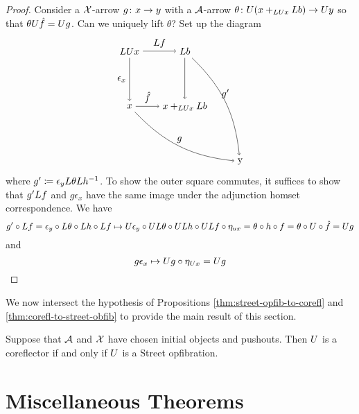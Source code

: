 \documentclass{amsart}
\begin{document}
\begin{proof}
  Consider a $ \mathcal{X} $-arrow $ g \colon x \to y $
  with a $ \mathcal{A} $-arrow
  $ \theta \colon U( x +_{LU x} L b ) \to U y $ so
  that $ \theta U \hat{f} = U g $.  Can we
  uniquely lift $ \theta $? Set up the diagram
  \[
    \begin{tikzpicture}
      \node (ul) at (0,2) {$ \L\U x $};
      \node (ll) at (0,0) {$ x $};
      \node (ur) at (2,2) {$ \L b $};
      \node (lr) at (2,0) {$ x +_{\L\U x} \L b$};
      \node (comp) at (4,-2) {y};
      \draw [->] (ul) to node [left] {$ \epsilon_x $} (ll);
      \draw [->] (ul) to node [above] {$ \L f $} (ur);
      \draw [->] (ll) to node [above] {$ \hat{f} $} (lr);
      \draw [->] (ur) to (lr);
      \draw [->] (ll) to [bend right=20] node [above] {$ g $} (comp);
      \draw [->] (ur) to [bend left=20] node [above] {$ g' $} (comp);
    \end{tikzpicture}
  \] 
  where $ g' \coloneqq \epsilon_y L\theta L h^{-1} $.
  To show the outer square commutes, it suffices
  to show that $ g' L f $ and $ g \epsilon_x $
  have the same image under the adjunction homset
  correspondence.  We have
  \[
    g' \circ L f =
    \epsilon_y \circ L\theta \circ L h \circ L f
    \mapsto
    U\epsilon_y \circ UL\theta \circ UL h
      \circ UL f \circ\eta_{ux}
    = \theta \circ h \circ f   
    = \theta \circ U \circ \hat{f} 
    = U g
  \]
  and 
  \[
    g \epsilon_x
    \mapsto
    U g \circ \eta_{U x}
    = U g
  \]
\end{proof}

We now intersect the hypothesis of Propositions
\ref{thm:street-opfib-to-corefl} and
\ref{thm:corefl-to-street-obfib} to provide the
main result of this section.

\begin{thm}
  \label{thm:main-theorem-street-version}
  Suppose that $ \mathcal{A} $ and $ \mathcal{X} $ have chosen
  initial objects and pushouts. Then $ U $ is a
  coreflector if and only if $ U $ is a Street
  opfibration.  
\end{thm}

\section{Miscellaneous Theorems}

\end{document}

